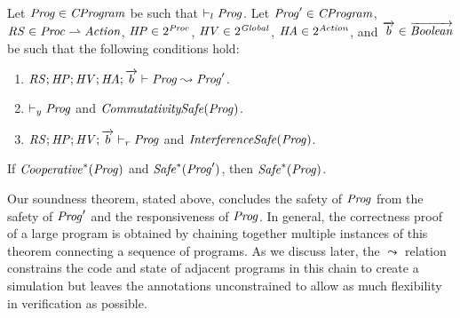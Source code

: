 \begin{theorem}
\label{thm:correctness}
Let $\mathit{Prog} \in \mathit{CProgram}$ be such that $\vdash_l \mathit{Prog}$.
Let $\mathit{Prog}' \in \mathit{CProgram}$, $\mathit{RS} \in \mathit{Proc} \rightharpoonup \mathit{Action}$, $\mathit{HP} \in 2^{\mathit{Proc}}$, 
$\mathit{HV} \in 2^{\mathit{Global}}$, $\mathit{HA} \in 2^{\mathit{Action}}$,
and $\overrightarrow{b} \in \overrightarrow{\mathit{Boolean}}$ be such that the following conditions hold:
\begin{enumerate}
\item
$\mathit{RS};\mathit{HP};\mathit{HV};\mathit{HA};\overrightarrow{b} \vdash \mathit{Prog} \leadsto \mathit{Prog}'$.
\item
$\vdash_y \mathit{Prog}$ and $\mathit{CommutativitySafe}(\mathit{Prog})$.
\item
$\mathit{RS};\mathit{HP};\mathit{HV};\overrightarrow{b} \vdash_r \mathit{Prog}$ and $\mathit{InterferenceSafe}(\mathit{Prog})$.
\end{enumerate}
If $\mathit{Cooperative}^*(\mathit{Prog})$ and $\mathit{Safe}^*(\mathit{Prog}')$, then $\mathit{Safe}^*(\mathit{Prog})$.
\end{theorem}

Our soundness theorem, stated above, concludes the safety of $\mathit{Prog}$ from the safety of $\mathit{Prog}'$ 
and the responsiveness of $\mathit{Prog}$.
In general, the correctness proof of a large program is obtained by chaining together
multiple instances of this theorem connecting a sequence of programs.  
As we discuss later, the $\leadsto$ relation constrains the code and state of adjacent programs in this chain 
to create a simulation but leaves the annotations unconstrained to allow as much flexibility in verification as possible.

